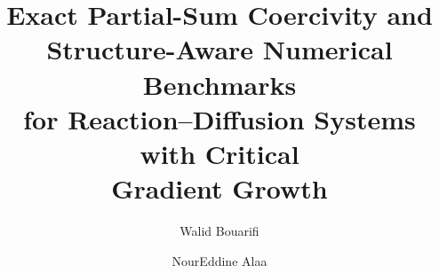 \documentclass{birkjour}
\theoremstyle{definition}
\theoremstyle{remark}
\numberwithin{equation}{section}
\begin{document}

\title[Exact Partial-Sum Coercivity and Structure-Aware Benchmarks]
{Exact Partial-Sum Coercivity and \\
Structure-Aware Numerical Benchmarks \\
for Reaction--Diffusion Systems with Critical \\
Gradient Growth}

\author[Bouarifi]{Walid Bouarifi}
\address{Laboratory in Intelligent and Sustainable Technologies (LaRTID),\\
National School of Applied Sciences of Marrakech,\\
Cadi AYYAD University, Morocco}

\author[Alaa]{NourEddine Alaa}
\address{Faculty of Sciences and Techniques of Marrakech,\\
Cadi Ayyad University, Morocco}


\end{document}
